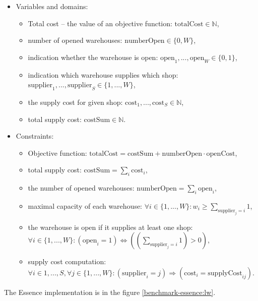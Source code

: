 	\begin{itemize}
  \item Variables and domains:
    \begin{itemize}
      \item Total cost -- the value of an objective function: $\mathrm{totalCost} \in \mathbb{N} $,
      \item number of opened warehouses: $\mathrm{numberOpen} \in \{0, W\}$,
      \item indication whether the warehouse is open: $\mathrm{open}_1, ..., \mathrm{open}_{W} \in \{0, 1\}$,
      \item indication which warehouse supplies which shop: $\mathrm{supplier}_1, ..., \mathrm{supplier}_{S} \in \{1, ..., W\}$,
      \item the supply cost for given shop: $\mathrm{cost}_1, ..., \mathrm{cost}_{S} \in \mathbb{N}$,
      \item total supply cost: $\mathrm{costSum} \in \mathbb{N}$.
    \end{itemize} 
	\item Constraints:
  	\begin{itemize}
  	 \item Objective function: $\mathrm{totalCost} = \mathrm{costSum} + \mathrm{numberOpen} \cdot \mathrm{openCost}$,
  	 \item total supply cost: $\mathrm{costSum} = \sum_i{\mathrm{cost}_i}$,
  	 \item the number of opened warehouses: $\mathrm{numberOpen} = \sum_i{\mathrm{open}_i}$,
  	 \item maximal capacity of each warehouse: $\forall i \in \{1,...,W\}: w_i \geq \sum_{\mathrm{supplier}_j = i}{1}$,
  	 \item the warehouse is open if it supplies at least one shop: $\forall i \in \{1,...,W\}: \left(\mathrm{open}_i = 1\right) \Leftrightarrow \left(\left(\sum_{\mathrm{supplier}_j = i}{1}\right) > 0\right)$,
  	 \item supply cost computation: $\forall i \in {1,...,S}, \forall j \in \{1,...,W\}: \left(\mathrm{supplier}_i = j\right) \Rightarrow \left(\mathrm{cost}_i = \mathrm{supplyCost}_{ij} \right)$.
     
    \end{itemize}
  \end{itemize} 
The Essence implementation is in the figure \ref{benchmark-essence:lw}.

